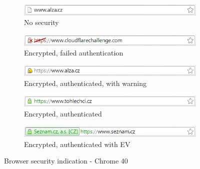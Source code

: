 \begin{figure}
  \begin{subfigure}[b]{\textwidth}
    \centering
    \includegraphics[scale=0.6]{images/browsers/ch-none.png}
    \caption{No security}
  \end{subfigure}
  \begin{subfigure}[b]{\textwidth}
    \centering
    \includegraphics[scale=0.6]{images/browsers/ch-untrusted.png}
    \caption{Encrypted, failed authentication}
  \end{subfigure}
  \begin{subfigure}[b]{\textwidth}
    \centering
    \includegraphics[scale=0.6]{images/browsers/ch-warning.png}
    \caption{Encrypted, authenticated, with warning}
  \end{subfigure}
  \begin{subfigure}[b]{\textwidth}
    \centering
    \includegraphics[scale=0.6]{images/browsers/ch-dv.png}
    \caption{Encrypted, authenticated}
  \end{subfigure}
  \begin{subfigure}[b]{\textwidth}
    \centering
    \includegraphics[scale=0.6]{images/browsers/ch-ev.png}
    \caption{Encrypted, authenticated with EV}
  \end{subfigure}
  \caption{Browser security indication - Chrome 40}
\end{figure}


